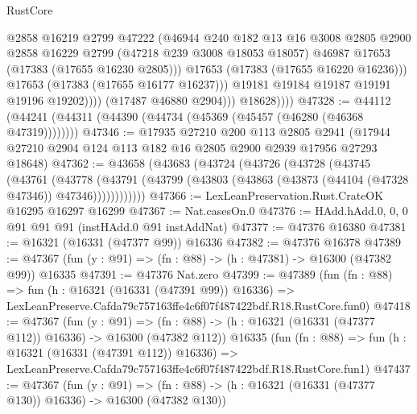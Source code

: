 \begin{lexlean}{RustCore}
\begin{coremodule}
                            @2858
                            @16219
                            @2799
                            @47222
                            (@46944
                              @240
                              @182
                              @13
                              @16
                              @3008
                              @2805
                              @2900
                              @2858
                              @16229
                              @2799
                              (@47218 @239 @3008 @18053 @18057)
                              @46987
                              @17653
                              (@17383 (@17655 @16230 @2805)))
                            @17653
                            (@17383 (@17655 @16220 @16236)))
                          @17653
                          (@17383 (@17655 @16177 @16237)))
                        @19181
                        @19184
                        @19187
                        @19191
                        @19196
                        @19202))))
                (@17487 @46880 @2904)))
            @18628))))
@47328 := @44112 (@44241 (@44311 (@44390 (@44734 (@45369 (@45457 (@46280 (@46368 @47319))))))))
@47346 := @17935
    @27210
    @200
    @113
    @2805
    @2941
    (@17944 @27210 @2904 @124 @113 @182 @16 @2805 @2900 @2939 @17956 @27293 @18648)
@47362 := @43658
    (@43683
      (@43724
        (@43726
          (@43728
            (@43745
              (@43761
                (@43778
                  (@43791
                    (@43799 (@43803 (@43863 (@43873 (@44104 (@47328 @47346)) @47346))))))))))))
@47366 := LexLeanPreservation.Rust.CrateOK @16295 @16297 @16299
@47367 := Nat.casesOn.{0}
@47376 := HAdd.hAdd.{0, 0, 0} @91 @91 @91 (instHAdd.{0} @91 instAddNat)
@47377 := @47376 @16380
@47381 := @16321 (@16331 (@47377 @99)) @16336
@47382 := @47376 @16378
@47389 := @47367 (fun (y : @91) => (fn : @88) -> (h : @47381) -> @16300 (@47382 @99)) @16335
@47391 := @47376 Nat.zero
@47399 := @47389
    (fun (fn : @88) =>
    fun (h : @16321 (@16331 (@47391 @99)) @16336) =>
    LexLeanPreserve.Cafda79c757163ffe4c6f07f487422bdf.R18.RustCore.fun0)
@47418 := @47367
    (fun (y : @91) =>
    (fn : @88) -> (h : @16321 (@16331 (@47377 @112)) @16336) -> @16300 (@47382 @112))
    @16335
    (fun (fn : @88) =>
    fun (h : @16321 (@16331 (@47391 @112)) @16336) =>
    LexLeanPreserve.Cafda79c757163ffe4c6f07f487422bdf.R18.RustCore.fun1)
@47437 := @47367
    (fun (y : @91) =>
    (fn : @88) -> (h : @16321 (@16331 (@47377 @130)) @16336) -> @16300 (@47382 @130))

\end{coremodule}
\end{lexlean}

